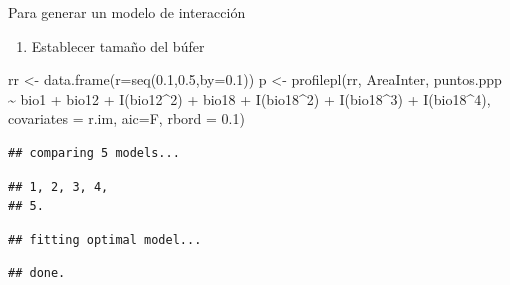 \documentclass[
  11pt,
  ignorenonframetext,
]{beamer}
\newenvironment{Shaded}{}{}
\newcommand{\AttributeTok}[1]{\textcolor[rgb]{0.49,0.56,0.16}{#1}}
\newcommand{\DecValTok}[1]{\textcolor[rgb]{0.25,0.63,0.44}{#1}}
\newcommand{\FloatTok}[1]{\textcolor[rgb]{0.25,0.63,0.44}{#1}}
\newcommand{\FunctionTok}[1]{\textcolor[rgb]{0.02,0.16,0.49}{#1}}
\newcommand{\NormalTok}[1]{#1}
\newcommand{\OtherTok}[1]{\textcolor[rgb]{0.00,0.44,0.13}{#1}}
\newcommand{\SpecialCharTok}[1]{\textcolor[rgb]{0.25,0.44,0.63}{#1}}
\providecommand{\tightlist}{%
  \setlength{\itemsep}{0pt}\setlength{\parskip}{0pt}}
\begin{document}
\begin{frame}[fragile]{Para generar un modelo de interacción}
\protect\hypertarget{para-generar-un-modelo-de-interacciuxf3n}{}
\begin{enumerate}
\tightlist
\item
  Establecer tamaño del búfer
\end{enumerate}

\begin{Shaded}
\begin{Highlighting}[]
\NormalTok{rr }\OtherTok{\textless{}{-}} \FunctionTok{data.frame}\NormalTok{(}\AttributeTok{r=}\FunctionTok{seq}\NormalTok{(}\FloatTok{0.1}\NormalTok{,}\FloatTok{0.5}\NormalTok{,}\AttributeTok{by=}\FloatTok{0.1}\NormalTok{))}
\NormalTok{p }\OtherTok{\textless{}{-}} \FunctionTok{profilepl}\NormalTok{(rr, AreaInter, }
\NormalTok{               puntos.ppp }\SpecialCharTok{\textasciitilde{}}\NormalTok{ bio1 }\SpecialCharTok{+}\NormalTok{ bio12 }\SpecialCharTok{+} \FunctionTok{I}\NormalTok{(bio12}\SpecialCharTok{\^{}}\DecValTok{2}\NormalTok{) }\SpecialCharTok{+} 
\NormalTok{                 bio18 }\SpecialCharTok{+} \FunctionTok{I}\NormalTok{(bio18}\SpecialCharTok{\^{}}\DecValTok{2}\NormalTok{) }\SpecialCharTok{+} 
                 \FunctionTok{I}\NormalTok{(bio18}\SpecialCharTok{\^{}}\DecValTok{3}\NormalTok{) }\SpecialCharTok{+} \FunctionTok{I}\NormalTok{(bio18}\SpecialCharTok{\^{}}\DecValTok{4}\NormalTok{),}
          \AttributeTok{covariates =}\NormalTok{ r.im, }\AttributeTok{aic=}\NormalTok{F, }\AttributeTok{rbord =} \FloatTok{0.1}\NormalTok{)}
\end{Highlighting}
\end{Shaded}

\begin{verbatim}
## comparing 5 models...
\end{verbatim}

\begin{verbatim}
## 1, 2, 3, 4, 
## 5.
\end{verbatim}

\begin{verbatim}
## fitting optimal model...
\end{verbatim}

\begin{verbatim}
## done.
\end{verbatim}
\end{frame}
\end{document}
